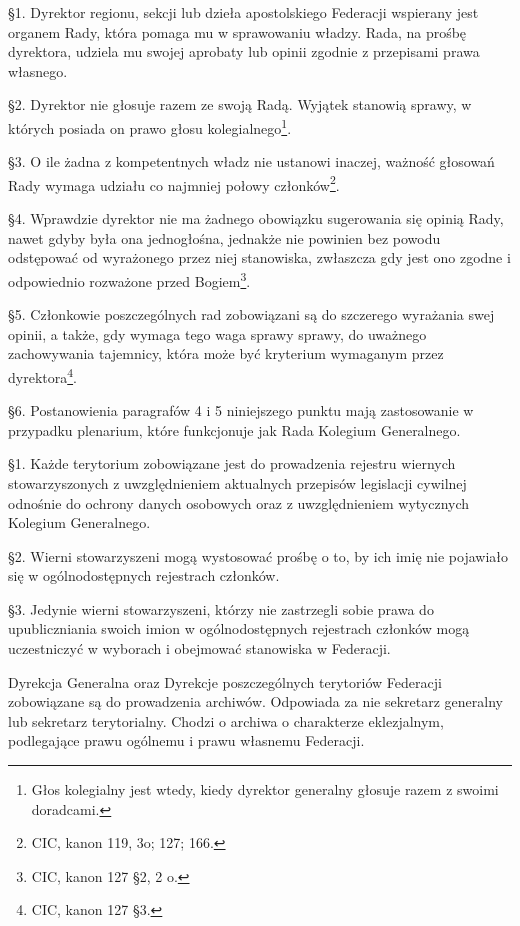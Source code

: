 
 \S{}1. Dyrektor regionu, sekcji lub dzieła apostolskiego Federacji wspierany jest organem Rady, która pomaga mu w sprawowaniu władzy. Rada, na prośbę dyrektora, udziela mu swojej aprobaty lub opinii zgodnie z przepisami prawa własnego.

\S{}2. Dyrektor nie głosuje razem ze swoją Radą. Wyjątek stanowią sprawy, w których posiada on prawo głosu kolegialnego\footnote{Głos kolegialny jest wtedy, kiedy dyrektor generalny głosuje razem z swoimi doradcami.}.

\S{}3. O ile żadna z kompetentnych władz nie ustanowi inaczej, ważność głosowań Rady wymaga udziału co najmniej połowy członków\footnote{CIC, kanon 119, 3o; 127; 166.}.

\S{}4. Wprawdzie dyrektor nie ma żadnego obowiązku sugerowania się opinią Rady, nawet gdyby była ona jednogłośna, jednakże nie powinien bez powodu odstępować od wyrażonego przez niej stanowiska, zwłaszcza gdy jest ono zgodne i odpowiednio rozważone przed Bogiem\footnote{CIC, kanon 127 \S{}2, 2 o.}.

\S{}5. Członkowie poszczególnych rad zobowiązani są do szczerego wyrażania swej opinii, a także, gdy wymaga tego waga sprawy sprawy, do uważnego zachowywania tajemnicy, która może być kryterium wymaganym przez dyrektora\footnote{CIC, kanon 127 \S{}3.}.

\S{}6. Postanowienia paragrafów 4 i 5 niniejszego punktu mają zastosowanie w przypadku plenarium, które funkcjonuje jak Rada Kolegium Generalnego.


 \S{}1. Każde terytorium zobowiązane jest do prowadzenia rejestru wiernych stowarzyszonych z uwzględnieniem aktualnych przepisów legislacji cywilnej odnośnie do ochrony danych osobowych oraz z uwzględnieniem wytycznych Kolegium Generalnego.

\S{}2. Wierni stowarzyszeni mogą wystosować prośbę o to, by ich imię nie pojawiało się w ogólnodostępnych rejestrach członków.

\S{}3. Jedynie wierni stowarzyszeni, którzy nie zastrzegli sobie prawa do upubliczniania swoich imion w ogólnodostępnych rejestrach członków mogą uczestniczyć w wyborach i obejmować stanowiska w Federacji.


 Dyrekcja Generalna oraz Dyrekcje poszczególnych terytoriów Federacji zobowiązane są do prowadzenia archiwów. Odpowiada za nie sekretarz generalny lub sekretarz terytorialny. Chodzi o archiwa o charakterze eklezjalnym, podlegające prawu ogólnemu i prawu własnemu Federacji.

